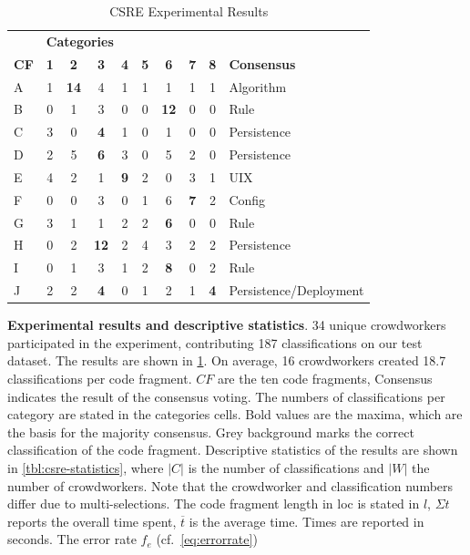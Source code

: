 \begin{table}[hbt]
  \caption[CSRE Experimental Results]{CSRE Experimental Results \autocite{Heil2019CSRECCIS}}
  \label{tbl:csre-results}
  \centering
    \begin{tabularx}{0.57\textwidth}{ l c c c c c c c c l }
        &  \multicolumn{8}{l}{\textbf{Categories}} \\
        \textbf{CF} & \textbf{1} & \textbf{2} & \textbf{3} & \textbf{4} & \textbf{5} & \textbf{6} & \textbf{7} & \textbf{8} & \textbf{Consensus}\\
    \hline
    A & 1 & \cellcolor{lightgray}\textbf{14} & 4 & 1 & 1 & 1 & 1 & 1 & Algorithm\\%
    B & 0 & 1 & 3 & 0 & 0 & \cellcolor{lightgray}\textbf{12} & 0 & 0 & Rule\\%
    C & 3 & 0 & \cellcolor{lightgray}\textbf{4} & 1 & 0 & 1 & 0 & 0 & Persistence\\%
    D & 2 & 5 & \cellcolor{lightgray}\textbf{6} & 3 & 0 & 5 & 2 & 0 & Persistence\\%
    E & 4 & 2 & 1 & \cellcolor{lightgray}\textbf{9} & 2 & 0 & 3 & 1 & UIX\\%
    F & 0 & 0 & 3 & 0 & 1 & 6 & \cellcolor{lightgray}\textbf{7} & 2 & Config\\%
    G & 3 & 1 & 1 & 2 & \cellcolor{lightgray}2 & \textbf{6} & 0 & 0 & Rule\\%
    H & 0 & 2 & \cellcolor{lightgray}\textbf{12} & 2 & 4 & 3 & 2 & 2 & Persistence\\%
    I & \cellcolor{lightgray}0 & 1 & 3 & 1 & 2 & \textbf{8} & 0 & 2 & Rule\\%
    J & 2 & 2 & \textbf{4} & 0 & 1 & 2 & \cellcolor{lightgray}1 & \textbf{4} & Persistence/Deployment\\%
    \hline
    \end{tabularx}
\end{table}
\setcounter{table}{1}

\textbf{Experimental results and descriptive statistics}. 34 unique crowdworkers participated in the experiment, contributing 187 classifications on our test dataset.
The results are shown in \cref{tbl:csre-results}.
On average, 16 crowdworkers created 18.7 classifications per code fragment.
\(CF\) are the ten code fragments, Consensus indicates the result of the consensus voting.
The numbers of classifications per category are stated in the categories cells.
Bold values are the maxima, which are the basis for the majority consensus.
Grey background marks the correct classification of the code fragment.
Descriptive statistics of the results are shown in \cref{tbl:csre-statistics}, where \(|C|\) is the number of classifications and \(|W|\) the number of crowdworkers.
Note that the crowdworker and classification numbers differ due to multi-selections.
The code fragment length in \gls{loc} is stated in \(l\), \(\Sigma t\) reports the overall time spent, \(\overline t\) is the average time.
Times are reported in seconds.
The error rate \(f_e\) (cf.~\cref{eq:errorrate})

